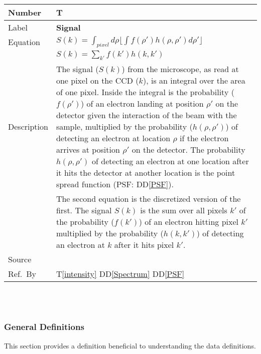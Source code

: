\documentclass[12pt]{article}
\newcommand{\colAwidth}{0.13\textwidth}
\newcommand{\colBwidth}{0.82\textwidth}
\newcommand{\ddref}[1]{DD\ref{#1}}
\newcounter{theorynum} %
\newcommand{\tref}[1]{T\ref{#1}}
\begin{document}
\noindent
\begin{minipage}{\textwidth}
	\renewcommand*{\arraystretch}{1.5}
	\begin{tabular}{| p{\colAwidth} | p{\colBwidth}|}
		  \hline
		  \rowcolor[gray]{0.9}
		  Number& T{theorynum}\thetheorynum \label{signal}\\
		  \hline
		  Label&\bf Signal \\
		  \hline
		  Equation& $S(k)=\int_{pixel}d\rho \lfloor \int f(\rho') h(\rho, \rho') d\rho' \rfloor$ \\
		  & $ S(k)=\sum_{k'} f(k') h(k, k')$\\
		  \hline
		  Description & The signal ($S(k)$) from the microscope, as read at one pixel on the CCD ($k$), is an integral over the area of one pixel. Inside the integral is the probability ($f(\rho')$) of an electron landing at position $\rho'$ on the detector given the interaction of the beam with the sample, multiplied by the probability ($h(\rho, \rho')$) of detecting an electron at location $\rho$ if the electron arrives at position $\rho'$ on the detector. The probability $h(\rho, \rho')$ of detecting an electron at one location after it hits the detector at another location is the point spread function (PSF: \ddref{PSF}).\\
		  & The second equation is the discretized version of the first. The signal $S(k)$ is the sum over all pixels $k'$ of the probability ($f(k')$) of an electron hitting pixel $k'$ multiplied by the probability ($h(k, k')$) of detecting an electron at $k$ after it hits pixel $k'$.\\
		  \hline
		  Source & \cite{zuo_electron_2000}\\
		  \hline
		  Ref.\ By & \tref{intensity} \ddref{Spectrum} \ddref{PSF}\\
		  \hline
	\end{tabular}
\end{minipage}\\

~\newline

\subsubsection{General Definitions}\label{sec_gendef}

This section provides a definition beneficial to understanding the data definitions.

~\newline
\end{document}
